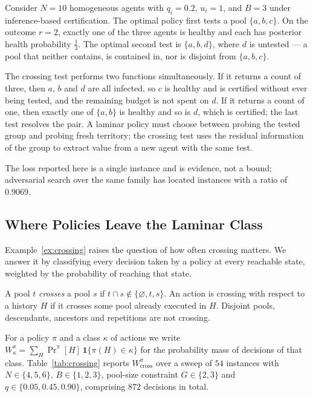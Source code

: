 \begin{example}
\label{ex:crossing}
Consider $N=10$ homogeneous agents with $q_i=0.2$, $u_i=1$, and $B=3$ under
inference-based certification. The optimal policy first tests a pool
$\{a,b,c\}$. On the outcome $r=2$, exactly one of the three agents is healthy
and each has posterior health probability $\tfrac13$. The optimal second test is
$\{a,b,d\}$, where $d$ is untested --- a pool that neither contains, is contained
in, nor is disjoint from $\{a,b,c\}$.

The crossing test performs two functions simultaneously. If it returns a count
of three, then $a$, $b$ and $d$ are all infected, so $c$ is healthy and is
certified without ever being tested, and the remaining budget is not spent on
$d$. If it returns a count of one, then exactly one of $\{a,b\}$ is healthy and
so is $d$, which is certified; the last test resolves the pair. A laminar policy
must choose between probing the tested group and probing fresh territory; the
crossing test uses the residual information of the group to extract value from a
new agent with the same test.
\end{example}

The loss reported here is a single instance and is evidence, not a bound;
adversarial search over the same family has located instances with a ratio of
$0.9069$.

\subsection{Where Policies Leave the Laminar Class}
\label{sec:anatomy-falsifier}

Example~\ref{ex:crossing} raises the question of how often crossing matters. We
answer it by classifying every decision taken by a policy at every reachable
state, weighted by the probability of reaching that state.

\begin{definition}[Crossing]
\label{def:crossing}
A pool $t$ \emph{crosses} a pool $s$ if $t\cap s\notin\{\varnothing,t,s\}$. An
action is crossing with respect to a history $H$ if it crosses some pool already
executed in $H$. Disjoint pools, descendants, ancestors and repetitions are not
crossing.
\end{definition}

For a policy $\pi$ and a class $\kappa$ of actions we write
$W^{\pi}_{\kappa}=\sum_{H}\Pr^{\pi}[H]\,\mathbf{1}\{\pi(H)\in\kappa\}$ for the
probability mass of decisions of that class. Table~\ref{tab:crossing} reports
$W^{\pi}_{\mathrm{cross}}$ over a sweep of $54$ instances with
$N\in\{4,5,6\}$, $B\in\{1,2,3\}$, pool-size constraint $G\in\{2,3\}$ and
$q\in\{0.05,0.45,0.90\}$, comprising $872$ decisions in total.

